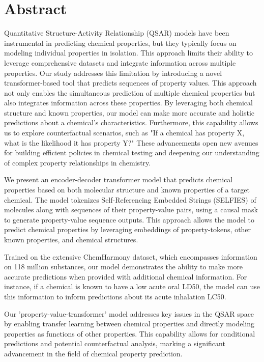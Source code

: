 \section{Abstract}

Quantitative Structure-Activity Relationship (QSAR) models have been instrumental in predicting chemical properties, but they typically focus on modeling individual properties in isolation. This approach limits their ability to leverage comprehensive datasets and integrate information across multiple properties. Our study addresses this limitation by introducing a novel transformer-based tool that predicts sequences of property values. This approach not only enables the simultaneous prediction of multiple chemical properties but also integrates information across these properties. By leveraging both chemical structure and known properties, our model can make more accurate and holistic predictions about a chemical's characteristics. Furthermore, this capability allows us to explore counterfactual scenarios, such as "If a chemical has property X, what is the likelihood it has property Y?" These advancements open new avenues for building efficient policies in chemical testing and deepening our understanding of complex property relationships in chemistry.

We present an encoder-decoder transformer model that predicts chemical properties based on both molecular structure and known properties of a target chemical. The model tokenizes Self-Referencing Embedded Strings (SELFIES) of molecules along with sequences of their property-value pairs, using a causal mask to generate property-value sequence outputs. This approach allows the model to predict chemical properties by leveraging embeddings of property-tokens, other known properties, and chemical structures.

Trained on the extensive ChemHarmony dataset, which encompasses information on 118 million substances, our model demonstrates the ability to make more accurate predictions when provided with additional chemical information. For instance, if a chemical is known to have a low acute oral LD50, the model can use this information to inform predictions about its acute inhalation LC50.

Our 'property-value-transformer' model addresses key issues in the QSAR space by enabling transfer learning between chemical properties and directly modeling properties as functions of other properties. This capability allows for conditional predictions and potential counterfactual analysis, marking a significant advancement in the field of chemical property prediction.
